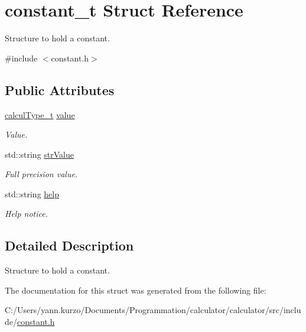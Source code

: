 \hypertarget{structconstant__t}{}\section{constant\+\_\+t Struct Reference}
\label{structconstant__t}


Structure to hold a constant.  




{\ttfamily \#include $<$constant.\+h$>$}

\subsection*{Public Attributes}
\begin{DoxyCompactItemize}
\item 
\hypertarget{structconstant__t_ad5bbdb3b9eeaf545fcbe15b07d8ab37a}{}\hyperlink{mpfr_interface_8h_a993860352aef57b15399903c4475a608}{calcul\+Type\+\_\+t} \hyperlink{structconstant__t_ad5bbdb3b9eeaf545fcbe15b07d8ab37a}{value}\label{structconstant__t_ad5bbdb3b9eeaf545fcbe15b07d8ab37a}

\begin{DoxyCompactList}\small\item\em Value. \end{DoxyCompactList}\item 
\hypertarget{structconstant__t_ad447d2a39a4f3a8c49ed2e481958def8}{}std\+::string \hyperlink{structconstant__t_ad447d2a39a4f3a8c49ed2e481958def8}{str\+Value}\label{structconstant__t_ad447d2a39a4f3a8c49ed2e481958def8}

\begin{DoxyCompactList}\small\item\em Full precision value. \end{DoxyCompactList}\item 
\hypertarget{structconstant__t_abfb53a8bb4b5803ac1f10cd7f0a571dd}{}std\+::string \hyperlink{structconstant__t_abfb53a8bb4b5803ac1f10cd7f0a571dd}{help}\label{structconstant__t_abfb53a8bb4b5803ac1f10cd7f0a571dd}

\begin{DoxyCompactList}\small\item\em Help notice. \end{DoxyCompactList}\end{DoxyCompactItemize}


\subsection{Detailed Description}
Structure to hold a constant. 

The documentation for this struct was generated from the following file\+:\begin{DoxyCompactItemize}
\item 
C\+:/\+Users/yann.\+kurzo/\+Documents/\+Programmation/calculator/calculator/src/include/\hyperlink{constant_8h}{constant.\+h}\end{DoxyCompactItemize}
